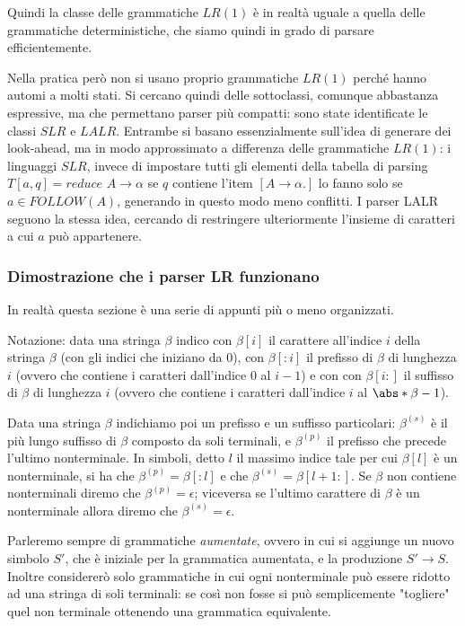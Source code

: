 \documentclass[12pt]{article}
\numberwithin{theorem}{subsection}
\begin{document}
Quindi la classe delle grammatiche $LR(1)$ è in realtà uguale a quella delle grammatiche deterministiche, che siamo quindi in grado di parsare efficientemente.

Nella pratica però non si usano proprio grammatiche $LR(1)$ perché hanno automi a molti stati. Si cercano quindi delle sottoclassi, comunque abbastanza espressive, ma che permettano parser più compatti: sono state identificate le classi $SLR$ e $LALR$. Entrambe si basano essenzialmente sull'idea di generare dei look-ahead, ma in modo approssimato a differenza delle grammatiche $LR(1)$: i linguaggi $SLR$, invece di impostare tutti gli elementi della tabella di parsing $T[a, q] = \textit{reduce } A \rightarrow \alpha$ se $q$ contiene l'item $[ A \rightarrow \alpha . ]$ lo fanno solo se $a \in FOLLOW(A)$, generando in questo modo meno conflitti. I parser LALR seguono la stessa idea, cercando di restringere ulteriormente l'insieme di caratteri a cui $a$ può appartenere.

\subsubsection{Dimostrazione che i parser LR funzionano}

In realtà questa sezione è una serie di appunti più o meno organizzati.

Notazione: data una stringa $\beta$ indico con $\beta[i]$ il carattere all'indice $i$ della stringa $\beta$ (con gli indici che iniziano da 0), con $\beta[:i]$ il prefisso di $\beta$ di lunghezza $i$ (ovvero che contiene i caratteri dall'indice $0$ al $i - 1$) e con con $\beta[i:]$ il suffisso di $\beta$ di lunghezza $i$ (ovvero che contiene i caratteri dall'indice $i$ al $\abs*{\beta} - 1$).

Data una stringa $\beta$ indichiamo poi un prefisso e un suffisso particolari: $\beta^{(s)}$ è il più lungo suffisso di $\beta$ composto da soli terminali, e $\beta^{(p)}$ il prefisso che precede l'ultimo nonterminale. In simboli, detto $l$ il massimo indice tale per cui $\beta[l]$ è un nonterminale, si ha che $\beta^{(p)} = \beta[:l]$ e che $\beta^{(s)} = \beta[l + 1:]$. Se $\beta$ non contiene nonterminali diremo che $\beta^{(p)} = \epsilon$; viceversa se l'ultimo carattere di $\beta$ è un nonterminale allora diremo che $\beta^{(s)} = \epsilon$.

Parleremo sempre di grammatiche \textit{aumentate}, ovvero in cui si aggiunge un nuovo simbolo $S'$, che è iniziale per la grammatica aumentata, e la produzione $S' \rightarrow S$. Inoltre considererò solo grammatiche in cui ogni nonterminale può essere ridotto ad una stringa di soli terminali: se così non fosse si può semplicemente "togliere" quel non terminale ottenendo una grammatica equivalente.
\end{document}
